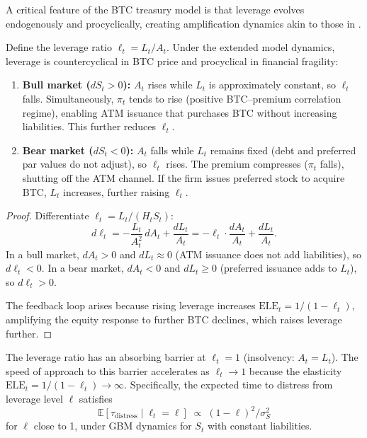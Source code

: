 A critical feature of the BTC treasury model is that leverage evolves
endogenously and procyclically, creating amplification dynamics akin to
those in \citet{brunnermeier2009market}.

\begin{theorem}\label{thm:procyclical}
Define the leverage ratio $\ell_t = L_t / A_t$.  Under the extended model
dynamics, leverage is countercyclical in BTC price and procyclical in
financial fragility:
\begin{enumerate}
  \item \textbf{Bull market ($dS_t > 0$):}
    $A_t$ rises while $L_t$ is approximately constant, so $\ell_t$ falls.
    Simultaneously, $\pi_t$ tends to rise (positive BTC--premium correlation
    regime), enabling ATM issuance that purchases BTC without increasing
    liabilities.  This further reduces $\ell_t$.
  \item \textbf{Bear market ($dS_t < 0$):}
    $A_t$ falls while $L_t$ remains fixed (debt and preferred par values
    do not adjust), so $\ell_t$ rises.  The premium compresses
    ($\pi_t$ falls), shutting off the ATM channel.  If the firm issues
    preferred stock to acquire BTC, $L_t$ increases, further raising
    $\ell_t$.
\end{enumerate}
\end{theorem}

\begin{proof}
Differentiate $\ell_t = L_t / (H_t S_t)$:
\begin{equation}\label{eq:dldt}
  d\ell_t
  = -\frac{L_t}{A_t^2}\, dA_t + \frac{dL_t}{A_t}
  = -\ell_t \cdot \frac{dA_t}{A_t} + \frac{dL_t}{A_t}.
\end{equation}
In a bull market, $dA_t > 0$ and $dL_t \approx 0$ (ATM issuance does not
add liabilities), so $d\ell_t < 0$.  In a bear market, $dA_t < 0$ and
$dL_t \ge 0$ (preferred issuance adds to $L_t$), so $d\ell_t > 0$.

The feedback loop arises because rising leverage increases
$\mathrm{ELE}_t = 1/(1 - \ell_t)$, amplifying the equity response to
further BTC declines, which raises leverage further.
\end{proof}

\begin{proposition}\label{prop:leverage_spiral}
The leverage ratio has an absorbing barrier at $\ell_t = 1$
(insolvency: $A_t = L_t$).  The speed of approach to this barrier
accelerates as $\ell_t \to 1$ because the elasticity
$\mathrm{ELE}_t = 1/(1-\ell_t) \to \infty$.  Specifically, the
expected time to distress from leverage level $\ell$ satisfies
\begin{equation}\label{eq:distress_time}
  \mathbb{E}[\tau_{\mathrm{distress}} \mid \ell_t = \ell]
  \;\propto\; (1 - \ell)^2 / \sigma_S^2
\end{equation}
for $\ell$ close to 1, under GBM dynamics for $S_t$ with constant
liabilities.
\end{proposition}

